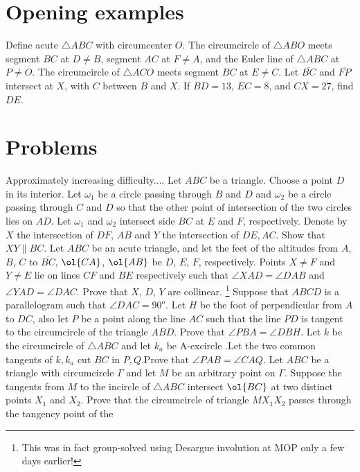 \documentclass{seto}
\begin{document}
\section{Opening examples}
\begin{block}
Define acute $\triangle ABC$ with circumcenter $O$. The circumcircle of $\triangle ABO$ meets segment $BC$ at $D \ne B$, segment $AC$ at $F \ne A$, and the Euler line of $\triangle ABC$ at $P \ne O$. The circumcircle of $\triangle ACO$ meets segment $BC$ at $E \ne C$. Let $\overline{BC}$ and $\overline{FP}$ intersect at $X$, with $C$ between $B$ and $X$. If $BD=13$, $EC=8$, and $CX=27$, find $DE$.
\end{block}

\section{Problems}
Approximately increasing difficulty....
 Let $ABC$ be a triangle. Choose a point $D$ in its interior. Let $\omega_1$ be a circle passing through $B$ and $D$ and $\omega_2$ be a circle passing through $C$ and $D$ so that the other point of intersection of the two circles lies on $AD$. Let $\omega_1$ and $\omega_2$ intersect side $BC$ at $E$ and $F$, respectively. Denote by $X$ the intersection of $DF$, $AB$ and $Y$ the intersection of $DE, AC$. Show that $XY \parallel BC$.
\exercise[CJMO 2021/1]Let $ABC$ be an acute triangle, and let the feet of the altitudes from $A$, $B$, $C$ to $\overline{BC}$, $\ol{CA}$, $\ol{AB}$ be $D$, $E$, $F$, respectively. Points $X\neq F$ and $Y\neq E$ lie on lines $CF$ and $BE$ respectively such that $\angle XAD = \angle DAB$ and $\angle YAD = \angle DAC$. Prove that $X$, $D$, $Y$
are collinear.
	\exercise[IGO 2018/I5]\footnote{This was in fact group-solved using Desargue involution at MOP only a few days earlier!} Suppose that $ABCD$ is a parallelogram such that $\angle DAC = 90^o$. Let $H$ be the foot of perpendicular from $A$ to $DC$, also let $P$ be a point along the line $AC$ such that the line $PD$ is tangent to the circumcircle of the triangle $ABD$. Prove that $\angle PBA = \angle DBH$. 
\exercise[Serbia 2017/6] Let $k$ be the circumcircle of $\triangle ABC$ and let $k_a$ be A-excircle .Let the two common tangents of $k,k_a$ cut $BC$ in $P,Q$.Prove that $\angle PAB=\angle CAQ$.
Let $ABC$ be a triangle with circumcircle $\Gamma$ and let $M$ be an arbitrary point on $\Gamma$. Suppose the tangents from $M$ to the incircle of 
$\triangle ABC$ intersect $\ol{BC}$ at two distinct points $X_1$ and $X_2$. Prove that the circumcircle of triangle $MX_1X_2$ passes through the tangency point of the 
\end{document}
